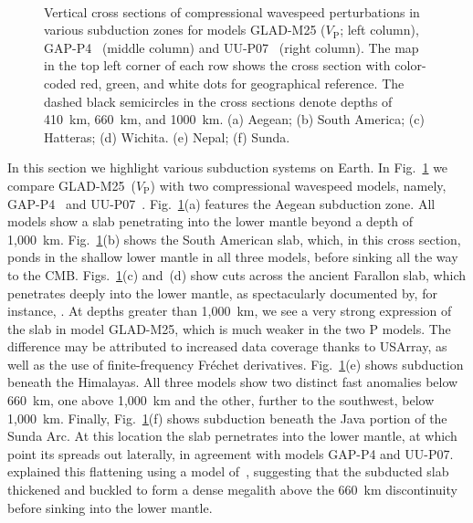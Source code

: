 \begin{figure}
    \\[-8pt]
    \caption{\small{Vertical cross sections of compressional wavespeed perturbations in various subduction zones
    for models GLAD-M25 ($V_\textrm{P}$; left column), GAP-P4~\cite{fukao2013subducted} (middle column) and UU-P07~\cite{van2018atlas} (right column).
    The map in the top left corner of each row shows the cross section with color-coded red, green, and white dots for geographical reference.
    The dashed black semicircles in the cross sections denote depths of 410~km, 660~km, and 1000~km.
    (a) Aegean; (b) South America; (c) Hatteras; (d) Wichita. (e) Nepal; (f) Sunda. }}
    \label{fig:subd}
\end{figure}

In this section we highlight various subduction systems on Earth.
In Fig.~\ref{fig:subd} we compare GLAD-M25~($V_\textrm{P}$) with two compressional wavespeed models,
namely, GAP-P4~\cite{fukao2013subducted} and UU-P07~\cite{van2018atlas}.
Fig.~\ref{fig:subd}(a) features the Aegean subduction zone. All models show a slab penetrating into the lower mantle beyond a depth of 1,000~km.
Fig.~\ref{fig:subd}(b) shows the South American slab, which, in this cross section, ponds in the shallow lower mantle in all three models, before sinking all the way to the CMB.
Figs.~\ref{fig:subd}(c) and~(d) show cuts across the ancient Farallon slab, which penetrates deeply into the lower mantle,
as spectacularly documented by, for instance, \citet{grand1994,hilst1997,grand1997high}.
At depths greater than 1,000~km, 
we see a very strong expression of the slab in model GLAD-M25, which is much weaker in the two P models.
The difference may be attributed to increased data coverage thanks to USArray, as well as the use of finite-frequency Fr\'echet derivatives.
Fig.~\ref{fig:subd}(e) shows subduction beneath the Himalayas.
All three models show two distinct fast anomalies below 660~km,
one above 1,000~km and the other, further to the southwest, below 1,000~km.
Finally, Fig.~\ref{fig:subd}(f) shows subduction beneath the Java portion of the Sunda Arc.
At this location the slab pernetrates into the lower mantle, at which point its spreads out laterally,
in agreement with models GAP-P4 and UU-P07.
\cite{fukao1992} explained this flattening using a model of~\cite{ringwood1988},
suggesting that the subducted slab thickened and buckled to form a dense megalith
above the 660~km discontinuity before sinking into the lower mantle.

